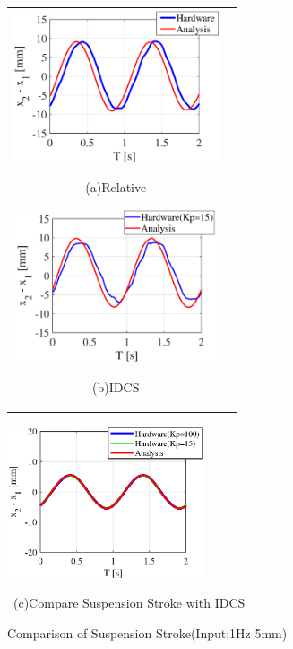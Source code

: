 \documentclass[a4paper,12pt]{article_vdlab_sotsuron}
\begin{document}
\vspace{5mm}
\begin{figure}[h]
  \begin{tabular}{cc}
  \begin{minipage}{0.5\hsize}
  \begin{center}
    \includegraphics[height=45mm]{figure/hils_rela_5_1.eps}
    \end{center}
    \begin{center}
    \ (a)Relative\
    \end{center}
  \end{minipage}
  \begin{minipage}{0.5\hsize}
     \begin{center}
      \includegraphics[height=45mm]{figure/hils_idcs_5_1.eps}
      \end{center}
      \begin{center}
      \ (b)IDCS\
    \end{center}
  \end{minipage}
  \end{tabular}
  \begin{center}
    \includegraphics[height=45mm]{figure/sim_idcs_5_1_nonlinear.eps}
  \end{center}
  \begin{center}
    \ (c)Compare Suspension Stroke with IDCS\
  \end{center}
  \vspace*{2mm}
  \caption{Comparison of Suspension Stroke(Input:1Hz 5mm)}
    \label{fig:hils_5_1}
\end{figure}
\end{document}
